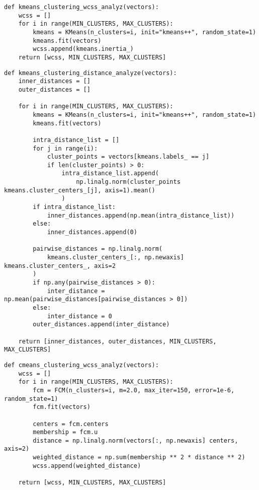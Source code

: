 \begin{lstlisting}[caption={Кластерный показатель для kmeans}]
    def kmeans_clustering_wcss_analyz(vectors):
    wcss = []
    for i in range(MIN_CLUSTERS, MAX_CLUSTERS):
        kmeans = KMeans(n_clusters=i, init="kmeans++", random_state=1)
        kmeans.fit(vectors)
        wcss.append(kmeans.inertia_)
    return [wcss, MIN_CLUSTERS, MAX_CLUSTERS]
\end{lstlisting}

\begin{lstlisting}[caption={Внутрикластерное и межкластерное расстояние для kmeans}]
    def kmeans_clustering_distance_analyze(vectors):
    inner_distances = []
    outer_distances = []
    
    for i in range(MIN_CLUSTERS, MAX_CLUSTERS):
        kmeans = KMeans(n_clusters=i, init="kmeans++", random_state=1)
        kmeans.fit(vectors)
        
        intra_distance_list = []
        for j in range(i):
            cluster_points = vectors[kmeans.labels_ == j]
            if len(cluster_points) > 0:
                intra_distance_list.append(
                    np.linalg.norm(cluster_points  kmeans.cluster_centers_[j], axis=1).mean()
                )
        if intra_distance_list:
            inner_distances.append(np.mean(intra_distance_list))
        else:
            inner_distances.append(0)
        
        pairwise_distances = np.linalg.norm(
            kmeans.cluster_centers_[:, np.newaxis]  kmeans.cluster_centers_, axis=2
        )
        if np.any(pairwise_distances > 0):
            inter_distance = np.mean(pairwise_distances[pairwise_distances > 0])
        else:
            inter_distance = 0
        outer_distances.append(inter_distance)
    
    return [inner_distances, outer_distances, MIN_CLUSTERS, MAX_CLUSTERS]
\end{lstlisting}

\begin{lstlisting}[caption={Кластерный показатель для cmeans}]
    def cmeans_clustering_wcss_analyz(vectors):
    wcss = []
    for i in range(MIN_CLUSTERS, MAX_CLUSTERS):
        fcm = FCM(n_clusters=i, m=2.0, max_iter=150, error=1e-6, random_state=1)
        fcm.fit(vectors)
        
        centers = fcm.centers
        membership = fcm.u 
        distance = np.linalg.norm(vectors[:, np.newaxis] centers, axis=2) 
        weighted_distance = np.sum(membership ** 2 * distance ** 2)
        wcss.append(weighted_distance)
    
    return [wcss, MIN_CLUSTERS, MAX_CLUSTERS]
\end{lstlisting}

